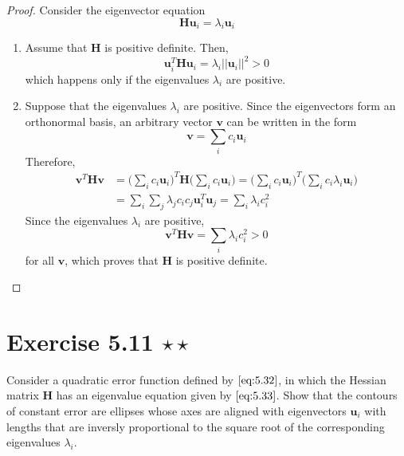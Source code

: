 \begin{proof}
    Consider the eigenvector equation
    \begin{equation}\label{eq:5.33}\tag{5.33}
        \mathbf{H}\mathbf{u}_i = \lambda_i \mathbf{u}_i
    \end{equation}
    \begin{enumerate}
        \item [\to] Assume that $\mathbf{H}$ is positive definite. Then,
    \[
        \mathbf{u}_i^T \mathbf{H} \mathbf{u}_i = \lambda_i ||\mathbf{u}_i||^2 > 0
    \] 
    which happens only if the eigenvalues $\lambda_i$ are positive.
    \vspace{1em}
    \item [\leftarrow] Suppose that the eigenvalues $\lambda_i$ are positive.
        Since the eigenvectors form an orthonormal basis, an arbitrary
        vector $\mathbf{v}$ can be written in the form
        \begin{equation}\label{eq:5.38}\tag{5.38}
            \mathbf{v} = \sum_{i} c_i \mathbf{u}_i 
        \end{equation}
        Therefore, 
        \begin{align*}
            \mathbf{v}^T\mathbf{H}\mathbf{v}
            &= \bigg(\sum_{i} c_i \mathbf{u}_i\bigg)^T \mathbf{H}
            \bigg(\sum_{i} c_i \mathbf{u}_i\bigg)
            = \bigg(\sum_{i} c_i \mathbf{u}_i\bigg)^T
            \bigg(\sum_{i} c_i \lambda_i \mathbf{u}_i\bigg) \\
            &= \sum_{i} \sum_{j} \lambda_j c_i c_j \mathbf{u}_i^T \mathbf{u}_j
            = \sum_{i} \lambda_i c_i^2
        \end{align*}
        Since the eigenvalues $\lambda_i$ are positive,
        \[
            \mathbf{v}^T\mathbf{H}\mathbf{v} = \sum_{i} \lambda_i c_i^2 > 0
        \] 
        for all $\mathbf{v}$, which proves that $\mathbf{H}$ is positive definite.
    \end{enumerate}
\end{proof}

\section*{Exercise 5.11 $\star \star$}
Consider a quadratic error function defined by $\eqref{eq:5.32}$, in which the
Hessian matrix $\mathbf{H}$ has an eigenvalue equation given by $\eqref{eq:5.33}$.
Show that the contours of constant error are ellipses whose axes are aligned
with eigenvectors $\mathbf{u}_i$ with lengths that are inversly proportional
to the square root of the corresponding eigenvalues $\lambda_i$.

